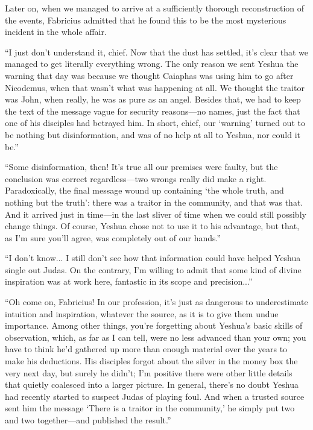 Later on, when we managed to arrive at a sufficiently thorough reconstruction of the events, Fabricius admitted that he found this to be the most mysterious incident in the whole affair.

``I just don't understand it, chief. Now that the dust has settled, it's clear that we managed to get literally everything wrong. The only reason we sent Yeshua the warning that day was because we thought Caiaphas was using him to go after Nicodemus, when that wasn't what was happening at all. We thought the traitor was John, when really, he was as pure as an angel. Besides that, we had to keep the text of the message vague for security reasons---no names, just the fact that one of his disciples had betrayed him. In short, chief, our `warning' turned out to be nothing but disinformation, and was of no help at all to Yeshua, nor could it be.''

``Some disinformation, then! It's true all our premises were faulty, but the conclusion was correct regardless---two wrongs really did make a right. Paradoxically, the final message wound up containing `the whole truth, and nothing but the truth': there was a traitor in the community, and that was that. And it arrived just in time---in the last sliver of time when we could still possibly change things. Of course, Yeshua chose not to use it to his advantage, but that, as I'm sure you'll agree, was completely out of our hands.''

``I don't know... I still don't see how that information could have helped Yeshua single out Judas. On the contrary, I'm willing to admit that some kind of divine inspiration was at work here, fantastic in its scope and precision...''

``Oh come on, Fabricius! In our profession, it's just as dangerous to underestimate intuition and inspiration, whatever the source, as it is to give them undue importance. Among other things, you're forgetting about Yeshua's basic skills of observation, which, as far as I can tell, were no less advanced than your own; you have to think he'd gathered up more than enough material over the years to make his deductions. His disciples forgot about the silver in the money box the very next day, but surely he didn't; I'm positive there were other little details that quietly coalesced into a larger picture. In general, there's no doubt Yeshua had recently started to suspect Judas of playing foul. And when a trusted source sent him the message `There is a traitor in the community,' he simply put two and two together---and published the result.''

